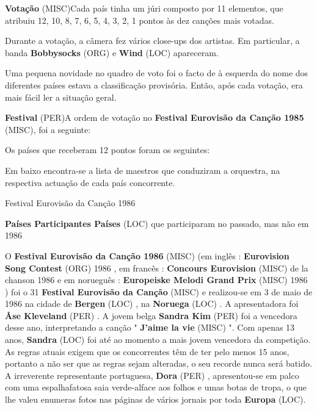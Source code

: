 \documentclass[12pt,a4paper]{article}
\begin{document}
\textbf{Votação} (MISC)Cada país tinha um júri composto por 11 elementos, que atribuiu 12, 10, 8, 7, 6, 5, 4, 3, 2, 1 pontos às dez canções mais votadas.

Durante a votação, a câmera fez vários close-ups dos artistas. Em particular, a banda \textbf{Bobbysocks} (ORG) e \textbf{Wind} (LOC) apareceram.

Uma pequena novidade no quadro de voto foi o facto de à esquerda do nome dos diferentes países estava a classificação provisória. Então, após cada votação, era mais fácil ler a situação geral.



\textbf{Festival} (PER)A ordem de votação no \textbf{Festival Eurovisão da Canção 1985} (MISC), foi a seguinte:

Os países que receberam 12 pontos foram os seguintes:

Em baixo encontra-se a lista de maestros que conduziram a orquestra, na respectiva actuação de cada país concorrente.



Festival Eurovisão da Canção 1986



\textbf{Países Participantes Países} (LOC) que participaram no passado, mas não em 1986

O \textbf{Festival Eurovisão da Canção 1986} (MISC) (em inglês : \textbf{Eurovision Song Contest} (ORG) 1986 , em francês : \textbf{Concours Eurovision} (MISC) de la chanson 1986 e em norueguês : \textbf{Europeiske Melodi Grand Prix} (MISC) 1986 ) foi o 31 \textbf{Festival Eurovisão da Canção} (MISC) e realizou-se em 3 de maio de 1986 na cidade de \textbf{Bergen} (LOC) , na \textbf{Noruega} (LOC) . A apresentadora foi \textbf{Åse Kleveland} (PER) . A jovem belga \textbf{Sandra Kim} (PER) foi a vencedora desse ano, interpretando a canção " \textbf{J'aime la vie} (MISC) ". Com apenas 13 anos, \textbf{Sandra} (LOC) foi até ao momento a mais jovem vencedora da competição. As regras atuais exigem que os concorrentes têm de ter pelo menos 15 anos, portanto a não ser que as regras sejam alteradas, o seu recorde nunca será batido. A irreverente representante portuguesa, \textbf{Dora} (PER) , apresentou-se em palco com uma espalhafatosa saia verde-alface aos folhos e umas botas de tropa, o que lhe valeu enumeras fotos nas páginas de vários jornais por toda \textbf{Europa} (LOC).
\end{document}

